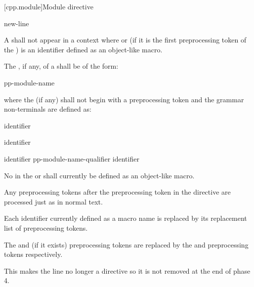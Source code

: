 [cpp.module]{Module directive}
%

\begin{bnf}
\br
       \terminal{;} new-line
\end{bnf}

\pnum
A  shall not
appear in a context where 
or (if it is the first preprocessing token of the ) 
is an identifier defined as an object-like macro.

\pnum
The , if any, of a 
shall be of the form:
\begin{ncsimplebnf}
pp-module-name  
\end{ncsimplebnf}
where the  (if any) shall not begin with
a \tcode{(} preprocessing token and
the grammar non-terminals are defined as:
\begin{ncbnf}
\br
     identifier
\end{ncbnf}
\begin{ncbnf}
\br
    \terminal{:}  identifier
\end{ncbnf}
\begin{ncbnf}
\br
    identifier \br
    pp-module-name-qualifier identifier 
\end{ncbnf}
No  in
the  or 
shall currently be defined as an object-like macro.

\pnum
Any preprocessing tokens after the  preprocessing token
in the  directive are processed just as in normal text.
\begin{note}
Each identifier currently defined as a macro name
is replaced by its replacement list of preprocessing tokens.
\end{note}

\pnum
The  and  (if it exists) preprocessing tokens
are replaced by the  and
 preprocessing tokens respectively.
\begin{note}
This makes the line no longer a directive
so it is not removed at the end of phase 4.
\end{note}

